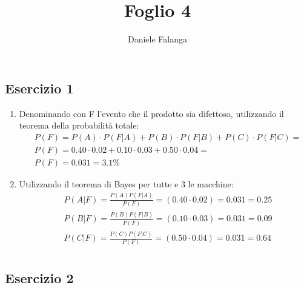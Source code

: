 \documentclass[12pt]{article}
\title{\textbf{Foglio 4}}
\author{Daniele Falanga}
\date{}
\begin{document}
\maketitle

\subsection*{Esercizio 1}
\begin{enumerate}
    \item Denominando con F l'evento che il prodotto sia difettoso, utilizzando il teorema della probabilità
    totale:    
    \begin{align*}
        &P(F) = P(A)\cdot P(F|A) + P(B)\cdot P(F|B) + P(C)\cdot P(F|C) = \\
        &P(F) = 0.40\cdot 0.02 + 0.10 \cdot 0.03 + 0.50 \cdot 0.04 = \\
        &P(F) = 0.031 = 3.1 \%
    \end{align*}
    \item Utilizzando il teorema di Bayes per tutte e 3 le macchine:
    \begin{align*}
        &P(A|F) = \frac{P(A)P(F|A)}{P(F)} = (0.40 \cdot 0.02) = 0.031 = 0.25\\
        &P(B|F) = \frac{P(B)P(F|B)}{P(F)} = (0.10 \cdot 0.03) = 0.031 = 0.09\\
        &P(C|F) = \frac{P(C)P(F|C)}{P(F)} = (0.50 \cdot 0.04) = 0.031 = 0.64\\
    \end{align*} 
\end{enumerate}

\newpage
\subsection*{Esercizio 2}
\end{document}
